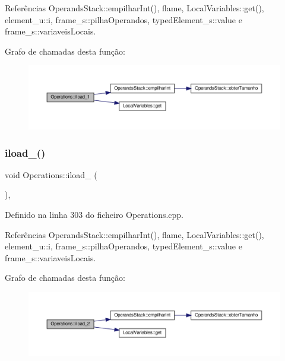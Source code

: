 Referências Operands\+Stack\+::empilhar\+Int(), flame, Local\+Variables\+::get(), element\+\_\+u\+::i, frame\+\_\+s\+::pilha\+Operandos, typed\+Element\+\_\+s\+::value e frame\+\_\+s\+::variaveis\+Locais.

Grafo de chamadas desta função\+:
\nopagebreak
\begin{figure}[H]
\begin{center}
\leavevmode
\includegraphics[width=350pt]{classOperations_a4b9d8ef21894c0db2203c06712e97765_cgraph}
\end{center}
\end{figure}
\mbox{\label{classOperations_affa5afeadb98117ea0ee66cf2687eb0a}} 
\subsubsection{\texorpdfstring{iload\+\_()}{iload\_2()}}
{\footnotesize\ttfamily void Operations\+::iload\+\_ (\begin{DoxyParamCaption}{ }\end{DoxyParamCaption})\hspace{0.3cm}{\ttfamily [static]}, {\ttfamily [private]}}



Definido na linha 303 do ficheiro Operations.\+cpp.



Referências Operands\+Stack\+::empilhar\+Int(), flame, Local\+Variables\+::get(), element\+\_\+u\+::i, frame\+\_\+s\+::pilha\+Operandos, typed\+Element\+\_\+s\+::value e frame\+\_\+s\+::variaveis\+Locais.

Grafo de chamadas desta função\+:
\nopagebreak
\begin{figure}[H]
\begin{center}
\leavevmode
\includegraphics[width=350pt]{classOperations_affa5afeadb98117ea0ee66cf2687eb0a_cgraph}
\end{center}
\end{figure}
\mbox{\label{classOperations_a3f645534291129289ee71c708dbe633c}} 
